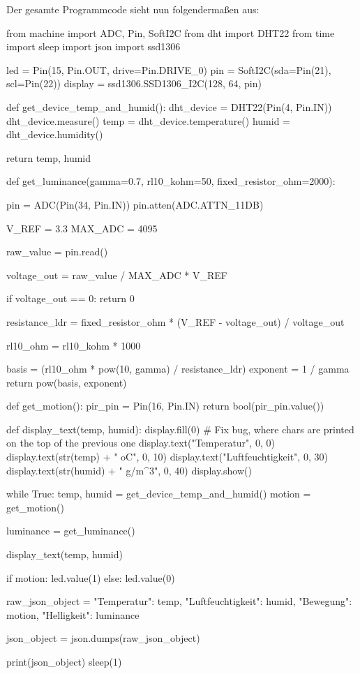 \documentclass[18pt]{article}
\begin{document}
Der gesamte Programmcode sieht nun folgendermaßen aus:
\newpage
\begin{python}
from machine import ADC, Pin, SoftI2C
from dht import DHT22
from time import sleep
import json
import ssd1306
	
led = Pin(15, Pin.OUT, drive=Pin.DRIVE_0)
pin = SoftI2C(sda=Pin(21), scl=Pin(22))
display = ssd1306.SSD1306_I2C(128, 64, pin)
	
def get_device_temp_and_humid():
	dht_device = DHT22(Pin(4, Pin.IN))
	dht_device.measure()
	temp = dht_device.temperature()
	humid = dht_device.humidity()
	
	return temp, humid
	
def get_luminance(gamma=0.7, 
	rl10_kohm=50, fixed_resistor_ohm=2000):

	pin = ADC(Pin(34, Pin.IN))
	pin.atten(ADC.ATTN_11DB)

	V_REF = 3.3 
	MAX_ADC = 4095

	raw_value = pin.read() 

	voltage_out = raw_value / MAX_ADC * V_REF

	if voltage_out == 0:
		return 0

	resistance_ldr = fixed_resistor_ohm * (V_REF - voltage_out) / voltage_out

	rl10_ohm = rl10_kohm * 1000 

	basis = (rl10_ohm * pow(10, gamma) / resistance_ldr)
	exponent = 1 / gamma
	return pow(basis, exponent)
	
def get_motion():
	pir_pin = Pin(16, Pin.IN)
	return bool(pir_pin.value())
	
def display_text(temp, humid):
	display.fill(0) # Fix bug, where chars are printed on the top of the previous one
	display.text("Temperatur", 0, 0)
	display.text(str(temp) + " oC", 0, 10)
	display.text("Luftfeuchtigkeit", 0, 30)
	display.text(str(humid) + " g/m^3", 0, 40)
	display.show()
	
	
while True:	
	temp, humid = get_device_temp_and_humid()
	motion = get_motion()
	
	luminance = get_luminance()
	
	display_text(temp, humid)
	
	if motion:
		led.value(1)
	else:
		led.value(0)
	
	raw_json_object = {
		"Temperatur": temp,
		"Luftfeuchtigkeit": humid,
		"Bewegung": motion,
		"Helligkeit": luminance
	}
	
	json_object = json.dumps(raw_json_object)
	
	print(json_object)
	sleep(1)
\end{python}
\end{document}
